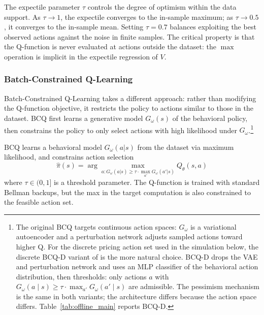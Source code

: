The expectile parameter $\tau$ controls the degree of optimism within the data support. As $\tau \to 1$, the expectile converges to the in-sample maximum; as $\tau \to 0.5$, it converges to the in-sample mean. Setting $\tau = 0.7$ balances exploiting the best observed actions against the noise in finite samples. The critical property is that the Q-function is never evaluated at actions outside the dataset: the $\max$ operation is implicit in the expectile regression of $V$.

\subsubsection{Batch-Constrained Q-Learning}

Batch-Constrained Q-Learning \citep[BCQ,][]{Fujimoto2019} takes a different approach: rather than modifying the Q-function objective, it restricts the policy to actions similar to those in the dataset. BCQ first learns a generative model $G_\omega(s)$ of the behavioral policy, then constrains the policy to only select actions with high likelihood under $G_\omega$.\footnote{The original \citet{Fujimoto2019} BCQ targets continuous action spaces: $G_\omega$ is a variational autoencoder and a perturbation network adjusts sampled actions toward higher Q. For the discrete pricing action set used in the simulation below, the discrete BCQ-D variant of \citet{Fujimoto2019b} is the more natural choice. BCQ-D drops the VAE and perturbation network and uses an MLP classifier of the behavioral action distribution, then thresholds: only actions $a$ with $G_\omega(a \mid s) \geq \tau \cdot \max_{a'} G_\omega(a' \mid s)$ are admissible. The pessimism mechanism is the same in both variants; the architecture differs because the action space differs. Table~\ref{tab:offline_main} reports BCQ-D.}

\begin{definition}
\label{def:bcq}
BCQ learns a behavioral model $G_\omega(a|s)$ from the dataset via maximum likelihood, and constrains action selection
\begin{equation}
\label{eq:bcq}
\hat{\pi}(s) = \arg\max_{a : G_\omega(a|s) \geq \tau \cdot \max_{a'} G_\omega(a'|s)} Q_\theta(s, a)
\end{equation}
where $\tau \in (0, 1]$ is a threshold parameter. The Q-function is trained with standard Bellman backups, but the max in the target computation is also constrained to the feasible action set.
\end{definition}

